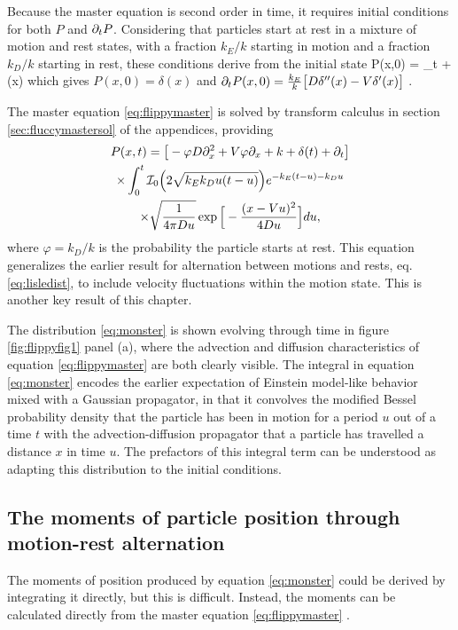 Because the master equation is second order in time, it requires initial conditions for both $P$ and $\partial_t P$. Considering that particles start at rest in a mixture of motion and rest states, with a fraction $k_E/k$ starting in motion and a fraction $k_D/k$ starting in rest, these conditions derive from the initial state 
\be P(x,0) = \lim_{t }   \exp{}+ \delta(x)\ee
which gives $P(x,0) = \delta(x)$ and $ \partial_t P(x,0) = \frac{k_E}{k}\big[D\delta''(x)-V \delta'(x) \big]$ \citep[c.f.][]{Weiss2002a}.

The master equation \ref{eq:flippymaster} is solved by transform calculus in section \ref{sec:fluccymastersol} of the appendices, providing
\begin{multline} P(x,t) = \big[-\varphi D\partial_x^2 + V\varphi \partial_x + k + \delta(t) +  \partial_t \big]\\
	\times \int_0^t \mathcal{I}_0\Big( 2 \sqrt{k_Ek_D u(t-u)}\Big) e^{-k_E(t-u)-k_D u} \\ \times \sqrt{ \frac{1}{4\pi D u}} \exp\Big[- \frac{(x-Vu)^2}{4Du}\Big] du, \label{eq:monster}
 \end{multline}
where $\varphi=k_D/k$ is the probability the particle starts at rest. This equation generalizes the earlier result \citep[e.g.][]{Lisle1998} for alternation between motions and rests, eq. \ref{eq:lisledist}, to include velocity fluctuations within the motion state. This is another key result of this chapter.

The distribution \ref{eq:monster} is shown evolving through time in figure \ref{fig:flippyfig1} panel (a), where the advection and diffusion characteristics of equation \ref{eq:flippymaster} are both clearly visible. The integral in equation \ref{eq:monster} encodes the earlier expectation of Einstein model-like behavior mixed with a Gaussian propagator, in that it convolves the modified Bessel probability density that the particle has been in motion for a period $u$ out of a time $t$ with the advection-diffusion propagator that a particle has travelled a distance $x$ in time $u$. The prefactors of this integral term can be understood as adapting this distribution to the initial conditions.

\subsection{The moments of particle position through motion-rest alternation}
The moments of position produced by equation \ref{eq:monster} could be derived by integrating it directly, but this is difficult. Instead, the moments can be calculated directly from the master equation \ref{eq:flippymaster} \citep{Cox1965}. 

